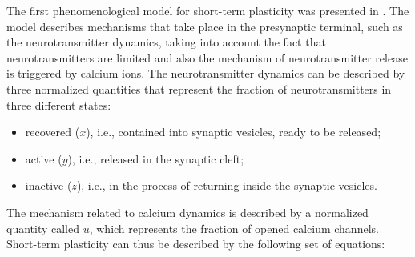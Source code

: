 \documentclass[a4paper, 12pt, twoside, openright]{book}
\begin{document}
The first phenomenological model for short-term plasticity was presented in \cite{tsodyks1998}. The model describes mechanisms that take place in the presynaptic terminal, such as the neurotransmitter dynamics, taking into account the fact that neurotransmitters are limited and also the mechanism of neurotransmitter release is triggered by calcium ions. The neurotransmitter dynamics can be described by three normalized quantities that represent the fraction of neurotransmitters in three different states:
\begin{itemize}
    \item recovered ($x$), i.e., contained into synaptic vesicles, ready to be released;
    \item active ($y$), i.e., released in the synaptic cleft;
    \item inactive ($z$), i.e., in the process of returning inside the synaptic vesicles.
\end{itemize}
The mechanism related to calcium dynamics is described by a normalized quantity called $u$, which represents the fraction of opened calcium channels. Short-term plasticity can thus be described by the following set of equations:
\end{document}

